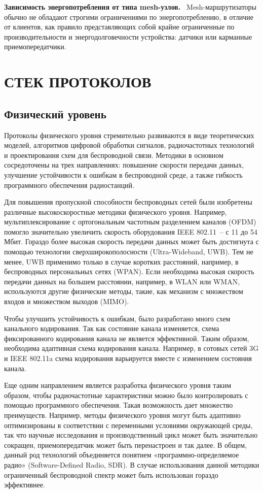 \documentclass[14pt,a4paper,titlepage]{extarticle}
\renewcommand{\paragraph}[1]{\textbf{#1.}~}
\begin{document}
\paragraph{Зависимость энергопотребления от типа mesh-узлов}
Mesh-маршрутизаторы обычно не обладают строгими ограничениями по энергопотреблению, в отличие от клиентов, как правило представляющих собой крайне ограниченные по производительности и энергодолговечности устройства: датчики или карманные приемопередатчики.

\section{СТЕК ПРОТОКОЛОВ}
\subsection{Физический уровень}
Протоколы физического уровня стремительно развиваются в виде теоретических моделей, алгоритмов цифровой обработки сигналов, радиочастотных технологий и проектирования схем для беспроводной связи. Методики в основном сосредоточены на трех направлениях: повышение скорости передачи данных, улучшение устойчивости к ошибкам в беспроводной среде, а также гибкость программного обеспечения радиостанций.

Для повышения пропускной способности беспроводных сетей были изобретены различные высокоскоростные методики физического уровня. Например, мультиплексирование с ортогональным частотным разделением каналов (OFDM) помогло значительно увеличить скорость оборудования IEEE 802.11~-- с 11 до 54 Мбит. Гораздо более высокая скорость передачи данных может быть достигнута с помощью технологии сверхширокополосности (Ultra-Wideband, UWB). Тем не менее, UWB применимо только в случае коротких расстояний, например, в беспроводных персональных сетях (WPAN). Если необходима высокая скорость передачи данных на большем расстоянии, например, в WLAN или WMAN, используются другие физические методы, такие, как механизм с множеством входов и множеством выходов (MIMO). 

Чтобы улучшить устойчивость к ошибкам, было разработано много схем канального кодирования. Так как состояние канала изменяется, схема фиксированного кодирования канала не является эффективной. Таким образом, необходима адаптивная схема кодирования канала. Например, в сотовых сетей 3G и IEEE 802.11a схема кодирования варьируется вместе с изменением состояния канала.

Еще одним направлением является разработка физического уровня таким образом, чтобы радиочастотные характеристики можно было контролировать с помощью программного обеспечения. Такая возможность дает множество преимуществ. Например, методы физического уровня могут быть адаптивно оптимизированы в соответствии с переменными условиями окружающей среды, так что научные исследования и производственный цикл может быть значительно сокращен, приемопередатчик может быть перенастроен и так далее. В общем, данный род технологий объединяется понятием «программно-определяемое радио» (Software-Defined Radio, SDR). В случае использования данной методики ограниченный беспроводной спектр может быть использован гораздо эффективнее.
\end{document}
